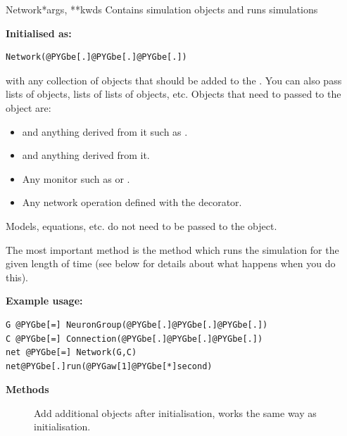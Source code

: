 \documentclass[letterpaper,10pt,english]{manual}
\begin{document}
\hypertarget{brian.Network}{}\begin{classdesc}{Network}{*args, **kwds}
Contains simulation objects and runs simulations

\textbf{Initialised as:}

\begin{Verbatim}[commandchars=@\[\]]
Network(@PYGbe[.]@PYGbe[.]@PYGbe[.])
\end{Verbatim}

with  any collection of objects that should be added to the \hyperlink{brian.Network}{}.
You can also pass lists of objects, lists of lists of objects, etc. Objects
that need to passed to the \hyperlink{brian.Network}{} object are:
\begin{itemize}
\item {} 
\hyperlink{brian.NeuronGroup}{} and anything derived from it such as \hyperlink{brian.PoissonGroup}{}.

\item {} 
\hyperlink{brian.Connection}{} and anything derived from it.

\item {} 
Any monitor such as \hyperlink{brian.SpikeMonitor}{} or \hyperlink{brian.StateMonitor}{}.

\item {} 
Any network operation defined with the \hyperlink{brian.network_operation}{} decorator.

\end{itemize}

Models, equations, etc. do not need to be passed to the \hyperlink{brian.Network}{} object.

The most important method is the  method which runs the simulation
for the given length of time (see below for details about what happens when you
do this).

\textbf{Example usage:}

\begin{Verbatim}[commandchars=@\[\]]
G @PYGbe[=] NeuronGroup(@PYGbe[.]@PYGbe[.]@PYGbe[.])
C @PYGbe[=] Connection(@PYGbe[.]@PYGbe[.]@PYGbe[.])
net @PYGbe[=] Network(G,C)
net@PYGbe[.]run(@PYGaw[1]@PYGbe[*]second)
\end{Verbatim}

\textbf{Methods}
\begin{description}
\item[]
Add additional objects after initialisation, works the same way
as initialisation.


\end{description}
\end{classdesc}
\end{document}
